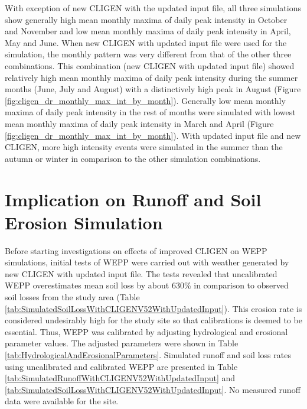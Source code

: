 With exception of new CLIGEN with the updated input file, all three simulations
show generally high mean monthly maxima of daily peak intensity in October and
November and low mean monthly maxima of daily peak intensity in April, May and
June. When new CLIGEN with updated input file were used for the simulation, the
monthly pattern was very different from that of the other three combinations.
This combination (new CLIGEN with updated input file) showed relatively high
mean monthly maxima of daily peak intensity during the summer months (June, July
and August) with a distinctively high peak in August (Figure
\ref{fig:cligen_dr_monthly_max_int_by_month}). Generally low mean monthly maxima
of daily peak intensity in the rest of months were simulated with lowest mean
monthly maxima of daily peak intensity in March and April (Figure
\ref{fig:cligen_dr_monthly_max_int_by_month}). With updated input file and new
CLIGEN, more high intensity events were simulated in the summer than the autumn
or winter in comparison to the other simulation combinations.

\section{Implication on Runoff and Soil Erosion Simulation}
\label{sec:RunoffAndSoilLossSimulation}
Before starting investigations on effects of improved CLIGEN on WEPP
simulations, initial tests of WEPP were carried out with weather generated by
new CLIGEN with updated input file. The tests revealed that uncalibrated WEPP
overestimates mean soil loss by about 630\% in comparison to observed soil
losses from the study area (Table
\ref{tab:SimulatedSoilLossWithCLIGENV52WithUpdatedInput}). This erosion rate is
considered undesirably high for the study site so that calibrations is
deemed to be essential. Thus, WEPP was calibrated by adjusting hydrological and
erosional parameter values. The adjusted parameters were shown in Table
\ref{tab:HydrologicalAndErosionalParameters}. Simulated runoff and soil loss
rates using uncalibrated and calibrated WEPP are presented in Table
\ref{tab:SimulatedRunoffWithCLIGENV52WithUpdatedInput} and
\ref{tab:SimulatedSoilLossWithCLIGENV52WithUpdatedInput}. No measured runoff
data were available for the site.

